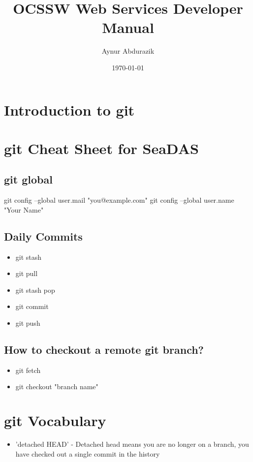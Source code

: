 \documentclass[11pt, oneside]{article}   	%
\title{OCSSW Web Services Developer Manual}
\author{Aynur Abdurazik}
\date{\today}							%
\begin{document}
\maketitle

\section{Introduction to git}


\section{git Cheat Sheet for SeaDAS}

\subsection{git global}
git config --global user.mail "you@example.com"
git config --global user.name "Your Name"

 \subsection{Daily Commits}
 \begin{itemize}
 \item git stash
 \item git pull
 \item git stash pop
 \item git commit
 \item git push
 \end{itemize}

 \subsection{How to checkout a remote git branch?}

\begin{itemize}
\item git fetch
\item git checkout "branch name"
\end{itemize}

\section{git Vocabulary}
\begin{itemize}
\item 'detached HEAD' - Detached head means you are no longer on a branch, you have checked out a single commit in the history
\end{itemize}
\end{document}
